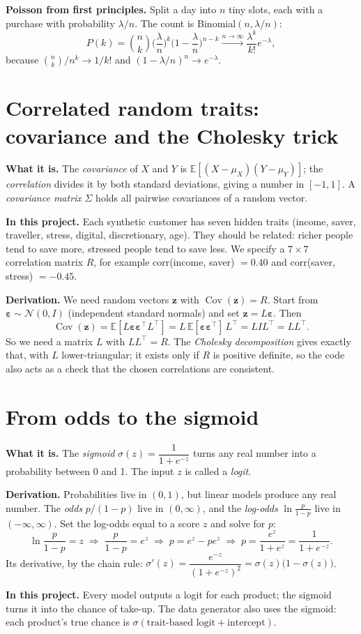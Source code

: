 \documentclass[10pt,a4paper]{article}
\newcommand{\what}[1]{\par\textbf{What it is.} #1}
\newcommand{\here}[1]{\par\textbf{In this project.} #1}
\newcommand{\deriv}{\par\textbf{Derivation.} }
\begin{document}
\textbf{Poisson from first principles.} Split a day into $n$ tiny slots, each with a purchase with probability $\lambda/n$. The count is Binomial$(n,\lambda/n)$:
\[P(k)=\binom{n}{k}\Big(\frac{\lambda}{n}\Big)^k\Big(1-\frac{\lambda}{n}\Big)^{n-k}\xrightarrow{n\to\infty}\frac{\lambda^k}{k!}e^{-\lambda},\]
because $\binom nk/n^k\to1/k!$ and $(1-\lambda/n)^n\to e^{-\lambda}$.

\section{Correlated random traits: covariance and the Cholesky trick}\label{sec:chol}
\what{The \emph{covariance} of $X$ and $Y$ is $\mathbb{E}[(X-\mu_X)(Y-\mu_Y)]$; the \emph{correlation} divides it by both standard deviations, giving a number in $[-1,1]$. A \emph{covariance matrix} $\Sigma$ holds all pairwise covariances of a random vector.}
\here{Each synthetic customer has seven hidden traits (income, saver, traveller, stress, digital, discretionary, age). They should be related: richer people tend to save more, stressed people tend to save less. We specify a $7\times7$ correlation matrix $R$, for example corr(income, saver) $=0.40$ and corr(saver, stress) $=-0.45$.}
\deriv We need random vectors $\mathbf{z}$ with $\operatorname{Cov}(\mathbf{z})=R$. Start from $\boldsymbol\varepsilon\sim\mathcal{N}(0,I)$ (independent standard normals) and set $\mathbf{z}=L\boldsymbol\varepsilon$. Then
\[\operatorname{Cov}(\mathbf{z})=\mathbb{E}[L\boldsymbol\varepsilon\boldsymbol\varepsilon^\top L^\top]=L\,\mathbb{E}[\boldsymbol\varepsilon\boldsymbol\varepsilon^\top]\,L^\top=LIL^\top=LL^\top.\]
So we need a matrix $L$ with $LL^\top=R$. The \emph{Cholesky decomposition} gives exactly that, with $L$ lower-triangular; it exists only if $R$ is positive definite, so the code also acts as a check that the chosen correlations are consistent.

\section{From odds to the sigmoid}\label{sec:sigmoid}
\what{The \emph{sigmoid} $\sigma(z)=\dfrac{1}{1+e^{-z}}$ turns any real number into a probability between 0 and 1. The input $z$ is called a \emph{logit}.}
\deriv Probabilities live in $(0,1)$, but linear models produce any real number. The \emph{odds} $p/(1-p)$ live in $(0,\infty)$, and the \emph{log-odds} $\ln\frac{p}{1-p}$ live in $(-\infty,\infty)$. Set the log-odds equal to a score $z$ and solve for $p$:
\[\ln\frac{p}{1-p}=z\;\Rightarrow\;\frac{p}{1-p}=e^{z}\;\Rightarrow\;p=e^z-pe^z\;\Rightarrow\;p=\frac{e^z}{1+e^z}=\frac{1}{1+e^{-z}}.\]
Its derivative, by the chain rule: $\sigma'(z)=\dfrac{e^{-z}}{(1+e^{-z})^2}=\sigma(z)\big(1-\sigma(z)\big)$.
\here{Every model outputs a logit for each product; the sigmoid turns it into the chance of take-up. The data generator also uses the sigmoid: each product's true chance is $\sigma(\text{trait-based logit}+\text{intercept})$.}
\end{document}
